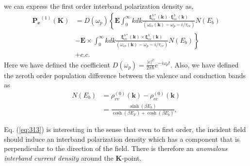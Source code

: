 \documentclass[twocolumn,secnumarabic,amssymb, nobibnotes, aps, prd, superscriptaddress]{revtex4-1}
\begin{document}
we can express the first order interband polarization density as,
\begin{equation}
\begin{aligned}\mathbf{P_{e}}^{(1)}(\mathbf{K}) & =D(\omega_{p})\left\{ \mathbf{E}\int_{0}^{\infty}kdk\frac{\mathbf{\xi}_{vc}^{b*}(\mathbf{k})\cdot\mathbf{\xi}_{vc}^{b}(\mathbf{k})}{\left(\omega_{cv}(\mathbf{k})-\omega_{p}-i/\tau_{cv}\right)}N(E_b)\right.\\
 & -\left.\mathbf{E}\times\int_{0}^{\infty}kdk\frac{\mathbf{\xi}_{vc}^{b*}(\mathbf{k})\times\mathbf{\xi}_{vc}^{b}(\mathbf{k})}{\left(\omega_{cv}(\mathbf{k})-\omega_{p}-i/\tau_{cv}\right)}N(E_b)\right\} \\
 & +c.c.
\end{aligned}
\label{eq:313}
\end{equation}
Here we have defined the coefficient $D(\omega_{p})=\frac{|e|^{2}}{2\pi\hbar}e^{-i\omega_{p}t}$. Also, we have defined the zeroth order population difference between the valence and conduction bands as
\begin{equation}
\begin{aligned}N(E_b) & =\rho_{vv}^{\left(0\right)}\left(\mathbf{k}\right)-\rho_{cc}^{(0)}(\mathbf{k})\\
 & =\frac{\sinh(\beta E_{b})}{\cosh(\beta E_{F})+\cosh(\beta E_{b})},
\end{aligned}
\end{equation}

Eq. (\ref{eq:313}) is interesting in the sense that even to first order, the incident field should induce an interband polarization density which has a component that is perpendicular to the direction of the field. There is therefore an \textit{anomalous interband current density} around the $\mathbf{K}$-point. 
\end{document}
